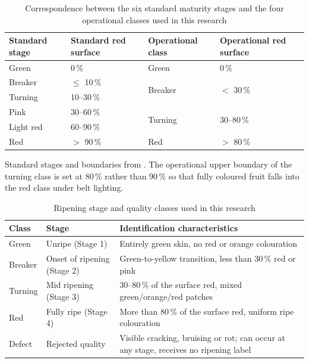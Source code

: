 \begin{table}[H]
\caption{Correspondence between the six standard maturity stages and the four operational classes used in this research}
\label{tab:merge}
\centering
\begin{tabular}{llll}
\toprule
\textbf{Standard stage} & \textbf{Standard red surface} & \textbf{Operational class} & \textbf{Operational red surface} \\
\midrule
Green      & 0\,\%      & Green   & 0\,\% \\
\midrule
Breaker    & $\leq$ 10\,\%   & \multirow{2}{*}{Breaker} & \multirow{2}{*}{$<$ 30\,\%} \\
Turning    & 10--30\,\% &         & \\
\midrule
Pink       & 30--60\,\% & \multirow{2}{*}{Turning} & \multirow{2}{*}{30--80\,\%} \\
Light red  & 60--90\,\% &         & \\
\midrule
Red        & $>$ 90\,\%  & Red     & $>$ 80\,\% \\
\bottomrule
\end{tabular}

\vspace{2mm}
{\footnotesize Standard stages and boundaries from \citet{usda1991}. The operational upper boundary of the turning class is set at 80\,\% rather than 90\,\% so that fully coloured fruit falls into the red class under belt lighting.}
\end{table}

\begin{table}[H]
\caption{Ripening stage and quality classes used in this research}
\label{tab:ripeness}
\centering
\begin{tabularx}{\textwidth}{p{1.9cm} p{3.3cm} X}
\toprule
\textbf{Class} & \textbf{Stage} & \textbf{Identification characteristics} \\
\midrule
Green   & Unripe (Stage 1)             & Entirely green skin, no red or orange colouration \\
Breaker & Onset of ripening (Stage 2)  & Green-to-yellow transition, less than 30\,\% red or pink \\
Turning & Mid ripening (Stage 3)       & 30--80\,\% of the surface red, mixed green/orange/red patches \\
Red     & Fully ripe (Stage 4)         & More than 80\,\% of the surface red, uniform ripe colouration \\
Defect  & Rejected quality             & Visible cracking, bruising or rot; can occur at any stage, receives no ripening label \\
\bottomrule
\end{tabularx}
\end{table}


